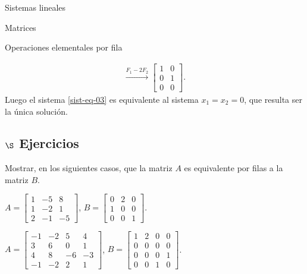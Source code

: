 \begin{chapter}{Sistemas lineales}
\begin{section}{Matrices}
\begin{subsection}{Operaciones elementales por fila}
\begin{ejemplo*}
\begin{multline*}
                    \stackrel{F_1-2F_2}{\longrightarrow} 
                    \begin{bmatrix} 1&0 \\ 0&1 \\ 0&0 \end{bmatrix}.
                    \end{multline*}
                    Luego  el sistema \eqref{sist-eq-03} es equivalente al sistema  $x_1=x_2 = 0$, que resulta ser la única solución.
                \end{ejemplo*}
            \end{subsection} 
        
            \subsection*{$\S$ Ejercicios}
            \begin{enumex}
                \item Mostrar, en los siguientes casos, que la matriz $A$ es equivalente por filas a la  matriz $B$.
                \begin{enumex}
                    \item 
                    $A = \begin{bmatrix}1& -5& 8\\1& -2& 1\\2& -1& -5\end{bmatrix}$, \quad 
                    $B= \begin{bmatrix}0& 2& 0\\1& 0& 0\\0& 0& 1\end{bmatrix}$.
                    \item 
                    $A = \begin{bmatrix}-1& -2& 5& 4\\3& 6& 0& 1\\4& 8& -6& -3\\-1& -2& 2& 1\end{bmatrix}$, \quad 
                    $B= \begin{bmatrix}1& 2& 0& 0\\0& 0& 0& 0\\0& 0& 0& 1\\0& 0& 1& 0\end{bmatrix}$.
                \end{enumex}
            \end{enumex}



\end{section}
\end{chapter}
